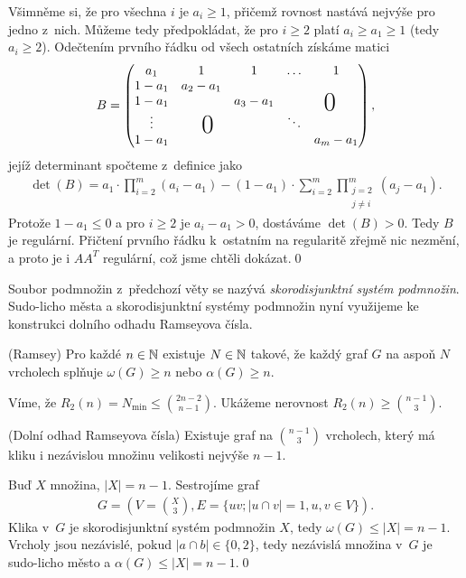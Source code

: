 Všimněme si, že pro všechna $i$ je $a_i\geq1$, přičemž rovnost nastává nejvýše pro jedno z~nich. Můžeme tedy předpokládat, že pro $i\geq2$ platí $a_i\geq a_1\geq1$ (tedy $a_i\geq2$). Odečtením prvního řádku od všech ostatních získáme matici
\renewcommand{\arraystretch}{1.2}
\begin{align}
	B=\left(\begin{matrix}
	a_1 & 1 &1&\hdots &1 \\
	1-a_1& a_2-a_1 &&&\smash{\raisebox{-10pt}{\bigzero}\quad} \\
	1-a_1&&a_3-a_1&&\\
	\vdots&&&\ddots&\\
	1-a_1&\smash{\quad\raisebox{15pt}{\bigzero}}&&&a_m-a_1
	\end{matrix}\right),
\end{align}
jejíž determinant spočteme z~definice jako
\begin{align}
  \det(B)=a_1\cdot\prod_{i=2}^m(a_i-a_1)-(1-a_1)\cdot\sum_{i=2}^m\prod_{\substack{j=2\\j\neq i}}^m(a_j-a_1).
\end{align}
Protože $1-a_1\leq0$ a pro $i\geq2$ je $a_i-a_1>0$, dostáváme $\det(B)>0$. Tedy $B$ je regulární. Přičtení prvního řádku k~ostatním na regularitě zřejmě nic nezmění, a proto je i $AA^T$ regulární, což jsme chtěli dokázat.\qed

\medskip
Soubor podmnožin z~předchozí věty se nazývá {\it skorodisjunktní systém podmnožin}. Sudo-licho města a skorodisjunktní systémy podmnožin nyní využijeme ke konstrukci dolního odhadu Ramseyova čísla.

\vt (Ramsey) Pro každé $n\in\mathbb{N}$ existuje $N\in\mathbb{N}$ takové, že každý graf $G$ na aspoň $N$ vrcholech splňuje $\omega(G)\geq n$ nebo $\alpha(G)\geq n$.

\medskip
Víme, že $R_2(n) = N_{\min} \leq{2n-2\choose n-1}$. Ukážeme nerovnost $R_2(n)\geq{n-1\choose3}$.

\vt (Dolní odhad Ramseyova čísla) Existuje graf na ${n-1\choose3}$ vrcholech, který má kliku i nezávislou množinu velikosti nejvýše $n-1$.

\dk Buď $X$ množina, $|X|=n-1$. Sestrojíme graf
\begin{align}
G=\left(V={X\choose 3}, E=\{uv; |u\cap v|=1, u,v\in V\}\right).
\end{align}
Klika v~$G$ je skorodisjunktní systém podmnožin $X$, tedy $\omega(G) \le |X| = n-1$. Vrcholy jsou nezávislé, pokud $|a\cap b| \in \{0,2\}$, tedy nezávislá množina v~$G$ je sudo-licho město a $\alpha(G) \le |X| = n-1$.\qed
